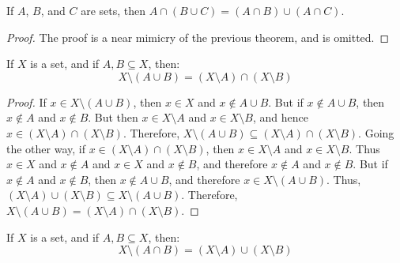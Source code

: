             \begin{theorem}
                If $A$, $B$, and $C$ are sets, then
                $A\cap(B\cup{C})=(A\cap{B})\cup(A\cap{C})$.
            \end{theorem}
            \begin{proof}
                The proof is a near mimicry of the previous theorem, and is
                omitted.
            \end{proof}
            \begin{theorem}
                If $X$ is a set, and if $A,B\subseteq{X}$, then:
                \begin{equation}
                    X\setminus(A\cup{B})=
                    (X\setminus{A})\cap(X\setminus{B})
                \end{equation}
            \end{theorem}
            \begin{proof}
                If $x\in{X}\setminus(A\cup{B})$, then
                $x\in{X}$ and $x\notin{A}\cup{B}$. But if
                $x\notin{A}\cup{B}$, then $x\notin{A}$ and
                $x\notin{B}$. But then
                $x\in{X}\setminus{A}$ and $x\in{X}\setminus{B}$, and
                hence $x\in(X\setminus{A})\cap(X\setminus{B})$. Therefore,
                $X\setminus(A\cup{B})\subseteq(X\setminus{A})\cap(X\setminus{B})$.
                Going the other way, if
                $x\in(X\setminus{A})\cap(X\setminus{B})$, then
                $x\in{X}\setminus{A}$ and $x\in{X}\setminus{B}$. Thus
                $x\in{X}$ and $x\notin{A}$ and $x\in{X}$ and $x\notin{B}$, and
                therefore $x\notin{A}$ and $x\notin{B}$. But if $x\notin{A}$
                and $x\notin{B}$, then $x\notin{A}\cup{B}$, and therefore
                $x\in{X}\setminus(A\cup{B})$. Thus,
                $(X\setminus{A})\cup(X\setminus{B})\subseteq{X}\setminus(A\cup{B})$.
                Therefore,
                $X\setminus(A\cup{B})=(X\setminus{A})\cap(X\setminus{B})$.
            \end{proof}
            \begin{theorem}
                If $X$ is a set, and if $A,B\subseteq{X}$, then:
                \begin{equation}
                    X\setminus(A\cap{B})=
                    (X\setminus{A})\cup(X\setminus{B})
                \end{equation}
            \end{theorem}
